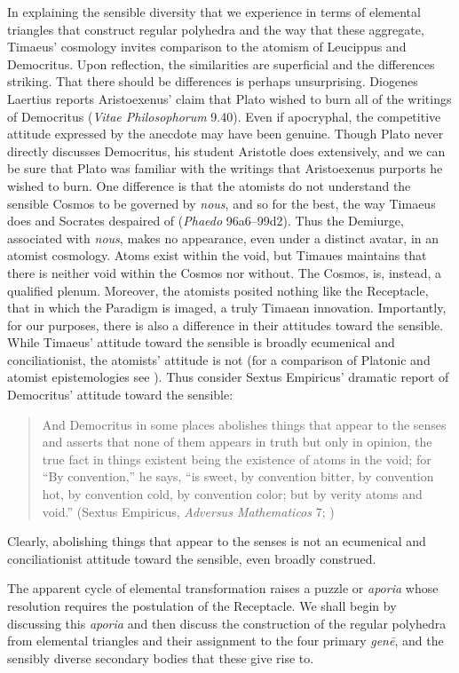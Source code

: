 In explaining the sensible diversity that we experience in terms of elemental triangles that construct regular polyhedra and the way that these aggregate, Timaeus' cosmology invites comparison to the atomism of Leucippus and Democritus. Upon reflection, the similarities are superficial and the differences striking. That there should be differences is perhaps unsurprising. Diogenes Laertius reports Aristoexenus' claim that Plato wished to burn all of the writings of Democritus (\emph{Vitae Philosophorum} 9.40). Even if apocryphal, the competitive attitude expressed by the anecdote may have been genuine. Though Plato never directly discusses Democritus, his student Aristotle does extensively, and we can be sure that Plato was familiar with the writings that Aristoexenus purports he wished to burn. One difference is that the atomists do not understand the sensible Cosmos to be governed by \emph{nous}, and so for the best, the way Timaeus does and Socrates despaired of (\emph{Phaedo} 96a6–99d2). Thus the Demiurge, associated with \emph{nous}, makes no appearance, even under a distinct avatar, in an atomist cosmology. Atoms exist within the void, but Timaues maintains that there is neither void within the Cosmos nor without. The Cosmos, is, instead, a qualified plenum. Moreover, the atomists posited nothing like the Receptacle, that in which the Paradigm is imaged, a truly Timaean innovation. Importantly, for our purposes, there is also a difference in their attitudes toward the sensible. While Timaeus' attitude toward the sensible is broadly ecumenical and conciliationist, the atomists' attitude is not (for a comparison of Platonic and atomist epistemologies see \citealt{Lee:2005qr}). Thus consider Sextus Empiricus' dramatic report of Democritus' attitude toward the sensible:
\begin{quote}
	And Democritus in some places abolishes things that appear to the senses and asserts that none of them appears in truth but only in opinion, the true fact in things existent being the existence of atoms in the void; for ``By convention,'' he says, ``is sweet, by convention bitter, by convention hot, by convention cold, by convention color; but by verity atoms and void.'' (Sextus Empiricus, \emph{Adversus Mathematicos} 7; \citealt{Bury:1997uq})
\end{quote}
Clearly, abolishing things that appear to the senses is not an ecumenical and conciliationist attitude toward the sensible, even broadly construed.

The apparent cycle of elemental transformation raises a puzzle or \emph{aporia} whose resolution requires the postulation of the Receptacle. We shall begin by discussing this \emph{aporia} and then discuss the construction of the regular polyhedra from elemental triangles and their assignment to the four primary \emph{genē}, and the sensibly diverse secondary bodies that these give rise to. 

